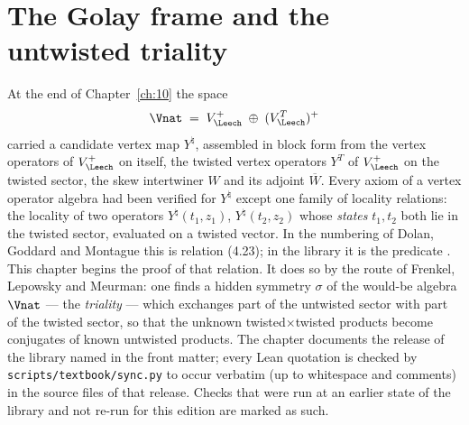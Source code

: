 \chapter{The Golay frame and the untwisted triality}\label{ch:11}

\providecommand{\chelLz}{\Lambda_0}
\providecommand{\chelVz}{V_0^{+}}
\providecommand{\chelVt}{V_3^{+}}
\providecommand{\chelN}{N}

At the end of Chapter~\ref{ch:10} the space
\begin{equation*}
  \Vnat \;=\; V_\Leech^{+}\;\oplus\;(V_\Leech^{T})^{+}
\end{equation*}
carried a candidate vertex map $Y^\natural$, assembled in block form from the vertex operators of
$V_\Leech^+$ on itself, the twisted vertex operators $Y^T$ of $V_\Leech^+$ on the twisted sector, the
skew intertwiner $W$ and its adjoint $\overline W$.  Every axiom of a vertex operator algebra had
been verified for $Y^\natural$ except one family of locality relations: the locality of two
operators $Y^\natural(t_1,z_1)$, $Y^\natural(t_2,z_2)$ whose \emph{states} $t_1,t_2$ both lie in the
twisted sector, evaluated on a twisted vector.  In the numbering of Dolan, Goddard and Montague this
is relation (4.23); in the library it is the predicate .  This chapter begins
the proof of that relation.  It does so by the route of Frenkel, Lepowsky and Meurman: one finds a
hidden symmetry $\sigma$ of the would-be algebra $\Vnat$ --- the \emph{triality} --- which exchanges
part of the untwisted sector with part of the twisted sector, so that the unknown
twisted$\times$twisted products become conjugates of known untwisted products.  The chapter documents the release of the library named in the front matter; every Lean quotation is checked by \texttt{scripts/textbook/sync.py} to occur verbatim
(up to whitespace and comments) in the source files of that release. Checks that were run at an earlier state of the library and not re-run for this edition are marked as such.

